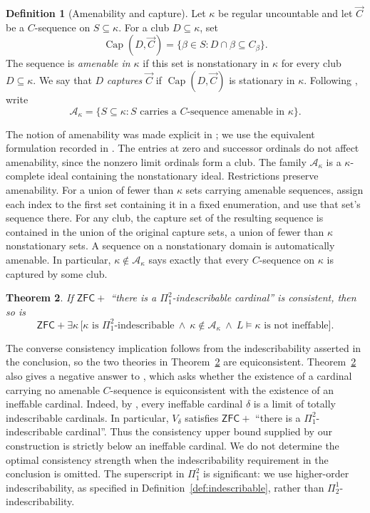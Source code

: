 \documentclass[11pt,a4paper]{amsart}
\newtheorem{theorem}{Theorem}[section]
\theoremstyle{definition}
\newtheorem{definition}[theorem]{Definition}
\theoremstyle{remark}
\newcommand{\A}{\mathcal A}
\newcommand{\ZFC}{\mathsf{ZFC}}
\begin{document}
\begin{definition}[Amenability and capture]
\label{def:amenability}
Let \(\kappa\) be regular uncountable and let \(\vec C\) be a
\(C\)-sequence on \(S\subseteq\kappa\). For a club
\(D\subseteq\kappa\), set
\[
 \operatorname{Cap}(D,\vec C)
   =\{\beta\in S:D\cap\beta\subseteq C_\beta\}.
\]
The sequence is \emph{amenable in \(\kappa\)} if this set is
nonstationary in \(\kappa\) for every club \(D\subseteq\kappa\).
We say that \(D\) \emph{captures} \(\vec C\) if
\(\operatorname{Cap}(D,\vec C)\) is stationary in \(\kappa\).
Following \cite[Definitions 4.1 and 4.3]{IR}, write
\[
 \A_\kappa
   =\{S\subseteq\kappa:S\text{ carries a \(C\)-sequence
                         amenable in \(\kappa\)}\}.
\]
\end{definition}

The notion of amenability was made explicit in \cite{BR};
we use the equivalent formulation recorded in
\cite[Definition 4.1 and Fact 4.2]{IR}.
The entries at zero and successor ordinals do not affect
amenability, since the nonzero limit ordinals form a club.
The family \(\A_\kappa\) is a \(\kappa\)-complete ideal
containing the nonstationary ideal. Restrictions preserve
amenability. For a union of fewer than \(\kappa\) sets carrying
amenable sequences, assign each index to the first set
containing it in a fixed enumeration, and use that set's
sequence there. For any club, the capture set of the resulting
sequence is contained in the union of the original capture
sets, a union of fewer than \(\kappa\) nonstationary sets.
A sequence on a nonstationary domain is automatically amenable.
In particular, \(\kappa\notin\A_\kappa\) says exactly that
every \(C\)-sequence on \(\kappa\) is captured by some club.

\begin{theorem}\label{thm:main}
If \(\ZFC+\) ``there is a \(\Pi^2_1\)-indescribable cardinal''
is consistent, then so is
\[
 \ZFC+\exists\kappa\,
 \bigl[\kappa\text{ is }\Pi^2_1\text{-indescribable}
       \ \land\ \kappa\notin\A_\kappa
       \ \land\ L\models\text{\(\kappa\) is not ineffable}\bigr].
\]
\end{theorem}

The converse consistency implication follows from the
indescribability asserted in the conclusion, so the two
theories in Theorem~\ref{thm:main} are equiconsistent.
Theorem~\ref{thm:main} also gives a negative answer to
\cite[Question~5.5]{BNZRad}, which asks whether the existence
of a cardinal carrying no amenable \(C\)-sequence is
equiconsistent with the existence of an ineffable cardinal.
Indeed, by \cite[Lemma~5.4]{HLN}, every ineffable cardinal
\(\delta\) is a limit of totally indescribable cardinals.
In particular, \(V_\delta\) satisfies \(\ZFC+\) ``there is
a \(\Pi^2_1\)-indescribable cardinal''. Thus the consistency
upper bound supplied by our construction is strictly below
an ineffable cardinal. We do not determine the optimal
consistency strength when the indescribability requirement
in the conclusion is omitted. The superscript in \(\Pi^2_1\)
is significant: we use higher-order indescribability,
as specified in Definition~\ref{def:indescribable},
rather than \(\Pi^1_2\)-indescribability.
\end{document}
